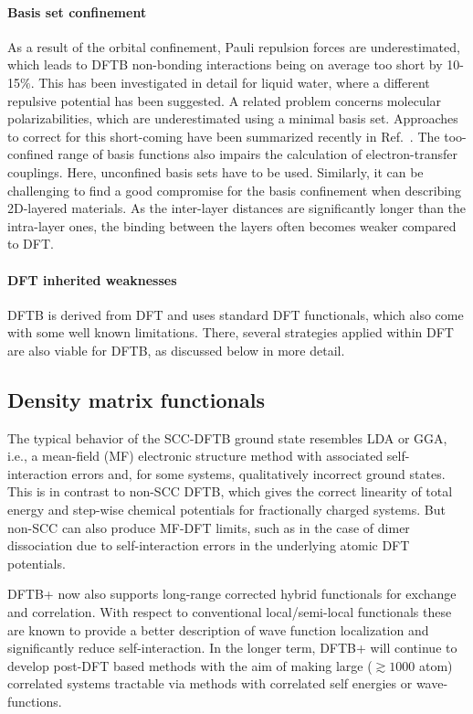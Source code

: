 \documentclass[reprint,onecolumn,superscriptaddress]{revtex4-1}
\newcommand{\dftbp}{DFTB+}
\begin{document}
\paragraph{Basis set confinement} As a result of the orbital confinement, Pauli
repulsion forces are underestimated, which leads to DFTB non-bonding
interactions being on average too short by 10-15$\%$. This has been investigated
in detail for liquid water, where a different repulsive potential has been
suggested.\cite{Goyal2014} A related problem concerns molecular
polarizabilities, which are underestimated using a minimal basis set. Approaches
to correct for this short-coming have been summarized recently in
Ref.~\cite{Christensen2016}. The too-confined range of basis functions
also impairs the calculation of electron-transfer couplings. Here, unconfined
basis sets have to be used.\cite{Kubas2014} Similarly, it can be challenging to
find a good compromise for the basis confinement when describing 2D-layered
materials. As the inter-layer distances are significantly longer than the
intra-layer ones, the binding between the layers often becomes weaker compared
to DFT.

\paragraph{DFT inherited weaknesses} DFTB is derived from DFT and uses standard
DFT functionals, which also come with some well known limitations. There,
several strategies applied within DFT are also viable for DFTB, as discussed
below in more detail.


\subsection{Density matrix functionals}

The typical behavior of the SCC-DFTB ground state resembles LDA or
GGA,\cite{hourahine07} i.e., a mean-field (MF) electronic structure method with
associated self-interaction errors and, for some systems, qualitatively
incorrect ground states. This is in contrast to non-SCC DFTB, which gives the
correct linearity of total energy and step-wise chemical
potentials\cite{PhysRevLett.49.1691} for fractionally charged systems. But
non-SCC can also produce MF-DFT limits, such as in the case of dimer
dissociation\cite{Rapacioli2011,Irle2012} due to self-interaction errors in the underlying
atomic DFT potentials.

\dftbp{} now also supports long-range corrected hybrid functionals for exchange
and correlation. With respect to conventional local/semi-local functionals these
are known to provide a better description of wave function localization and
significantly reduce self-interaction.\cite{Baer2010} In the longer term,
\dftbp{} will continue to develop post-DFT based methods with the aim of making
large ($\gtrsim 1000$ atom) correlated systems tractable via methods with
correlated self energies or wave-functions.
\end{document}
